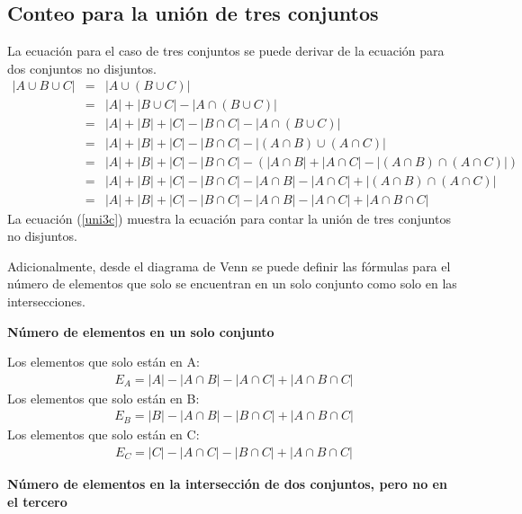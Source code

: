 \subsection{Conteo para la unión de tres conjuntos}
La ecuación para el caso de tres conjuntos se puede derivar de la ecuación para dos conjuntos no disjuntos.
\begin{eqnarray}
|A\cup B\cup C|&=&|A\cup (B\cup C)|\nonumber\\
&=&|A|+|B\cup C|-|A\cap (B\cup C)| \nonumber\\
&=&|A|+|B|+|C|-|B\cap C|-|A\cap (B\cup C)|\nonumber\\
&=&|A|+|B|+|C|-|B\cap C|-|(A\cap B)\cup(A\cap C)|\nonumber\\
&=&|A|+|B|+|C|-|B\cap C|-(|A\cap B|+|A\cap C|-|(A\cap B)\cap(A\cap C)|)\nonumber\\
&=&|A|+|B|+|C|-|B\cap C|-|A\cap B|-|A\cap C|+|(A\cap B)\cap(A\cap C)|\nonumber\\
&=&|A|+|B|+|C|-|B\cap C|-|A\cap B|-|A\cap C|+|A\cap B\cap C|
\label{uni3c}
\end{eqnarray}
La ecuación (\ref{uni3c}) muestra la ecuación para contar la unión de tres conjuntos no disjuntos.

Adicionalmente, desde el diagrama de Venn se puede definir las fórmulas para el número de elementos que solo se encuentran en un solo conjunto como solo en las intersecciones.\\

\begin{center}
\textbf{Número de elementos en un solo conjunto}\\
\end{center}


\noindent Los elementos que solo están en A:
\begin{eqnarray}
E_{A}=|A|-|A\cap B|-|A\cap C|+|A\cap B\cap C|
\end{eqnarray}
\noindent Los elementos que solo están en B:
\begin{eqnarray}
E_{B}=|B|-|A\cap B|-|B\cap C|+|A\cap B\cap C|
\end{eqnarray}
\noindent Los elementos que solo están en C:
\begin{eqnarray}
E_{C}=|C|-|A\cap C|-|B\cap C|+|A\cap B\cap C|
\end{eqnarray}

\begin{center}
\textbf{Número de elementos en la intersección de dos conjuntos, pero no en el tercero}\\
\end{center}

